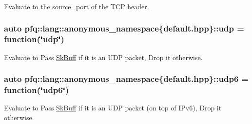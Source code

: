 Evaluate to the {\ttfamily source\+\_\+port} of the T\+CP header. 

\subsubsection[{\texorpdfstring{udp}{udp}}]{\setlength{\rightskip}{0pt plus 5cm}auto pfq\+::lang\+::anonymous\+\_\+namespace\{default.\+hpp\}\+::udp = {\bf function}(\char`\"{}udp\char`\"{})}\hypertarget{namespacepfq_1_1lang_1_1anonymous__namespace_02default_8hpp_03_a0b8b927aad3be7034521ebde0dabf7d3}{}\label{namespacepfq_1_1lang_1_1anonymous__namespace_02default_8hpp_03_a0b8b927aad3be7034521ebde0dabf7d3}


Evaluate to {\ttfamily Pass} \hyperlink{structpfq_1_1lang_1_1SkBuff}{Sk\+Buff} if it is an U\+DP packet, {\ttfamily Drop} it otherwise. 

\subsubsection[{\texorpdfstring{udp6}{udp6}}]{\setlength{\rightskip}{0pt plus 5cm}auto pfq\+::lang\+::anonymous\+\_\+namespace\{default.\+hpp\}\+::udp6 = {\bf function}(\char`\"{}udp6\char`\"{})}\hypertarget{namespacepfq_1_1lang_1_1anonymous__namespace_02default_8hpp_03_a37f7f4eb5cff8508b956eba7dee75a45}{}\label{namespacepfq_1_1lang_1_1anonymous__namespace_02default_8hpp_03_a37f7f4eb5cff8508b956eba7dee75a45}


Evaluate to {\ttfamily Pass} \hyperlink{structpfq_1_1lang_1_1SkBuff}{Sk\+Buff} if it is an U\+DP packet (on top of I\+Pv6), {\ttfamily Drop} it otherwise. 

